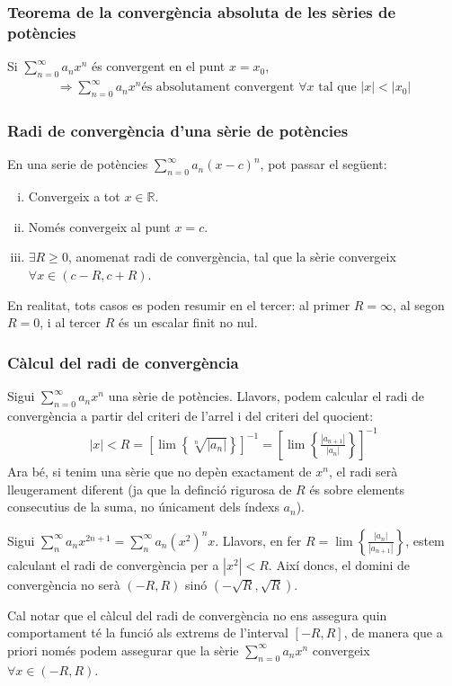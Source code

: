 \subsubsection*{Teorema de la convergència absoluta de les sèries de potències}
Si $\sum_{n=0}^{\infty} a_{n} x^{n}$ és convergent en el punt $x = x_{0}$, 
\begin{align}
    \Rightarrow \sum\limits_{n=0}^{\infty} a_{n} x^{n} \text{és absolutament convergent $\forall x$ tal que } |x| < |x_{0}|
\end{align}

\subsubsection*{Radi de convergència d'una sèrie de potències}
En una serie de potències $\sum\limits_{n=0}^{\infty} a_{n} (x-c)^{n}$, pot passar el següent:
\begin{enumerate}[i)]
    \item Convergeix a tot $x \in \mathbb{R}$.
    \item Només convergeix al punt $x = c$.
    \item $\exists R \geq 0$, anomenat radi de convergència, tal que la sèrie convergeix $\forall x \in (c-R , c+R)$.
\end{enumerate}
En realitat, tots casos es poden resumir en el tercer: al primer $R = \infty$, al segon $R = 0$, i al tercer $R$ és un escalar finit no nul.

\subsubsection*{Càlcul del radi de convergència}
Sigui $\sum\limits_{n=0}^{\infty} a_{n} x^{n}$ una sèrie de potències. Llavors, podem calcular el radi de convergència a partir del criteri de l'arrel i del criteri del quocient:
\begin{align}
    |x| < R = \left[ \lim \left\{ \sqrt[n]{|a_{n}|} \right\} \right]^{-1} = \left[ \lim \left\{ \frac{|a_{n+1}|}{|a_{n}|} \right\} \right]^{-1}
\end{align}
Ara bé, si tenim una sèrie que no depèn exactament de $x^{n}$, el radi serà lleugerament diferent (ja que la definció rigurosa de $R$ és sobre elements consecutius de la suma, no únicament dels índexs $a_{n}$).
\begin{example}
Sigui $\sum_{n}^{\infty} a_{n} x^{2n+1} = \sum_{n}^{\infty} a_{n} (x^{2})^{n} x$. Llavors, en fer $R = \lim \left\{ \frac{|a_{n}|}{|a_{n+1}|} \right\}$, estem calculant el radi de convergència per a $|x^{2}| < R$. Així doncs, el domini de convergència no serà $(-R, R)$ sinó $(-\sqrt{R}, \sqrt{R})$.
\end{example}
Cal notar que el càlcul del radi de convergència no ens assegura quin comportament té la funció als extrems de l'interval $[-R, R]$, de manera que a priori només podem assegurar que la sèrie $\sum_{n=0}^{\infty} a_{n} x^{n}$ convergeix $\forall x \in (-R , R)$.

